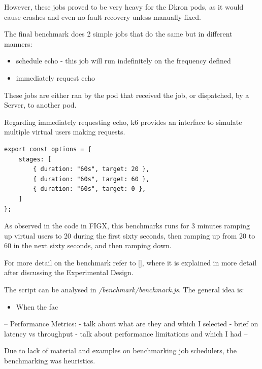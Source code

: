 \documentclass[runningheads]{llncs}
\begin{document}
However, these jobs proved to be very heavy for the Dkron pods, as it would cause crashes and even no
fault recovery unless manually fixed.

The final benchmark does 2 simple jobs that do the same but in different manners:
\begin{itemize}
    \item schedule echo - this job will run indefinitely on the frequency defined
    \item immediately request echo
\end{itemize}

These jobs are either ran by the pod that received the job, or dispatched, by a Server, to another pod.

Regarding immediately requesting echo, k6 provides an interface to simulate multiple virtual users
making requests.

\begin{verbatim}
export const options = {
    stages: [
        { duration: "60s", target: 20 },
        { duration: "60s", target: 60 },
        { duration: "60s", target: 0 },
    ]
};
\end{verbatim}

As observed in the code in FIGX, this benchmarks runs for 3 minutes ramping up virtual
users to 20 during the first sixty seconds, then ramping up from 20 to 60 in the next sixty seconds,
and then ramping down.

For more detail on the benchmark refer to \ref{}, where it is explained in
more detail after discussing the Experimental Design.

The script can be analysed in \textit{/benchmark/benchmark.js}. The general idea is:
\begin{itemize}
    \item When the fac
\end{itemize}



--
Performance Metrics:
- talk about what are they and which I selected
- brief on latency vs throughput
- talk about performance limitations and which I had
--

Due to lack of material and examples on benchmarking job schedulers, the benchmarking was heuristics.
\end{document}
